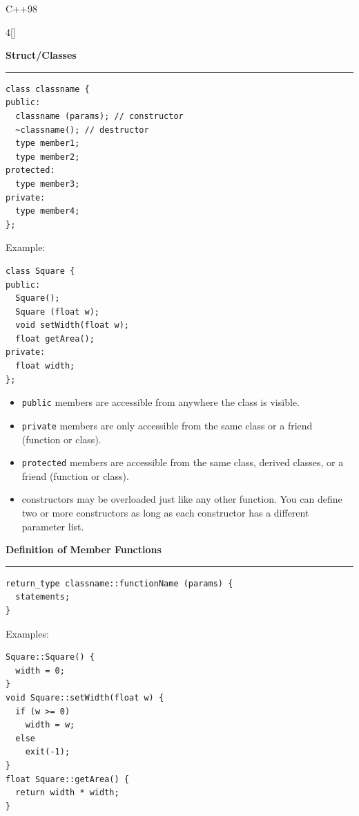 \documentclass[final]{beamer}
\renewcommand{\subsection}[1]{%
  \par\vspace{1em}%
  {\noindent\large\bfseries #1\par}%
  \vspace{0.5em}\hrule\vspace{1em}%
}
\begin{document}
\begin{frame}[t,fragile]{C++98}
\begin{multicols}{4}[\setlength{\columnsep}{1.5cm}]
 \subsection{Struct/Classes}
 \vspace{-1.cm}

\begin{lstlisting}
class classname {
public:
  classname (params); // constructor
  ~classname(); // destructor
  type member1;
  type member2;
protected:
  type member3;
private:
  type member4;
};
\end{lstlisting}
Example:
\begin{lstlisting}
class Square {
public:
  Square();
  Square (float w);
  void setWidth(float w);
  float getArea();
private:
  float width;
};
\end{lstlisting}
\begin{itemize}
    \item \texttt{public} members are accessible from anywhere the class is visible.
    \item \texttt{private} members are only accessible from the same class or a friend (function or class).
    \item \texttt{protected} members are accessible from the same class, derived classes, or a friend (function or class).
    \item constructors may be overloaded just like any other function. You can define two or more constructors as long as each constructor has a different parameter list.
\end{itemize}

 \subsection{Definition of Member Functions}
\begin{lstlisting}
return_type classname::functionName (params) {
  statements;
}
\end{lstlisting}
Examples:
\begin{lstlisting}
Square::Square() {
  width = 0;
}
void Square::setWidth(float w) {
  if (w >= 0)
    width = w;
  else
    exit(-1);
}
float Square::getArea() {
  return width * width;
}
\end{lstlisting}


\end{multicols}
\end{frame}
\end{document}
